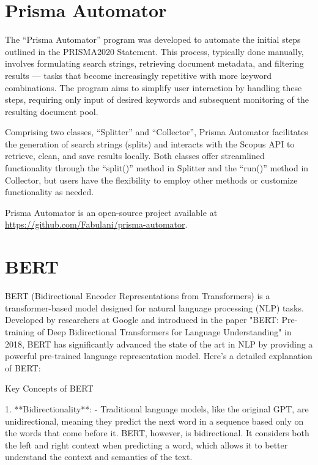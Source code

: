 \chapter{Prisma Automator}\label{chap:Prisma Automator}

The ``Prisma Automator'' program was developed to automate the initial steps outlined in the PRISMA2020 Statement\cite{prismastatement}. This process, typically done manually, involves formulating search strings, retrieving document metadata, and filtering results — tasks that become increasingly repetitive with more keyword combinations. The program aims to simplify user interaction by handling these steps, requiring only input of desired keywords and subsequent monitoring of the resulting document pool.

Comprising two classes, ``Splitter'' and ``Collector'', Prisma Automator facilitates the generation of search strings (splits) and interacts with the Scopus API to retrieve, clean, and save results locally. Both classes offer streamlined functionality through the ``split()'' method in Splitter and the ``run()'' method in Collector, but users have the flexibility to employ other methods or customize functionality as needed. 

Prisma Automator is an open-source project available at \url{https://github.com/Fabulani/prisma-automator}.


\chapter{BERT}


BERT (Bidirectional Encoder Representations from Transformers) is a transformer-based model designed for natural language processing (NLP) tasks. Developed by researchers at Google and introduced in the paper "BERT: Pre-training of Deep Bidirectional Transformers for Language Understanding" in 2018, BERT has significantly advanced the state of the art in NLP by providing a powerful pre-trained language representation model. Here's a detailed explanation of BERT:

 Key Concepts of BERT

1. **Bidirectionality**:
   - Traditional language models, like the original GPT, are unidirectional, meaning they predict the next word in a sequence based only on the words that come before it. BERT, however, is bidirectional. It considers both the left and right context when predicting a word, which allows it to better understand the context and semantics of the text.

